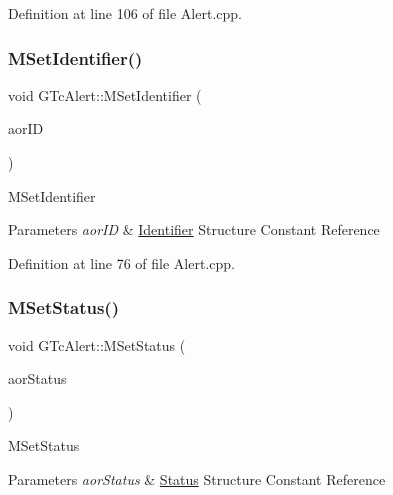 Definition at line 106 of file Alert.\+cpp.

\mbox{\label{class_g_n_common_1_1_g_tc_alert_acbb3761e5ca1af6896c20933be06255f}} 
\subsubsection{\texorpdfstring{M\+Set\+Identifier()}{MSetIdentifier()}}
{\footnotesize\ttfamily void G\+Tc\+Alert\+::\+M\+Set\+Identifier (\begin{DoxyParamCaption}\item[{const \mbox{\hyperlink{struct_g_n_common_1_1_g_tc_alert_1_1_ts_identifier}{Ts\+Identifier}} \&}]{aor\+ID }\end{DoxyParamCaption})}

M\+Set\+Identifier 
\begin{DoxyParams}{Parameters}
{\em aor\+ID} & \mbox{\hyperlink{struct_identifier}{Identifier}} Structure Constant Reference \\
\hline
\end{DoxyParams}


Definition at line 76 of file Alert.\+cpp.

\mbox{\label{class_g_n_common_1_1_g_tc_alert_a6e5a7e686b2e78573337c18a49f8d421}} 
\subsubsection{\texorpdfstring{M\+Set\+Status()}{MSetStatus()}}
{\footnotesize\ttfamily void G\+Tc\+Alert\+::\+M\+Set\+Status (\begin{DoxyParamCaption}\item[{const \mbox{\hyperlink{struct_g_n_common_1_1_g_tc_alert_1_1_ts_status}{Ts\+Status}} \&}]{aor\+Status }\end{DoxyParamCaption})}

M\+Set\+Status 
\begin{DoxyParams}{Parameters}
{\em aor\+Status} & \mbox{\hyperlink{struct_status}{Status}} Structure Constant Reference \\
\hline
\end{DoxyParams}


